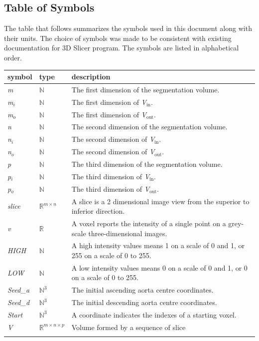 \documentclass[12pt]{article}
\begin{document}
\subsection{Table of Symbols}

The table that follows summarizes the symbols used in this document along with
their units.  The choice of symbols was made to be consistent with existing documentation for 3D Slicer program. 
The symbols are listed in alphabetical order.

\renewcommand{\arraystretch}{1.2}
\noindent \begin{longtable}{l p{2cm} p{12cm}} \toprule
  \textbf{symbol} & \textbf{type} & \textbf{description}\\
  \midrule
\textit{m} & $\mathbb{N}$ &  The first dimension of the segmentation volume.
\\
\textit{m}$_{i}$ & $\mathbb{N}$ &  The first dimension of \textit{V}$_\text{in}$.
\\
\textit{m}$_{o}$ & $\mathbb{N}$ &  The first dimension of \textit{V}$_\text{out}$.
\\
\textit{n} & $\mathbb{N}$ &  The second dimension of the segmentation volume.
\\
\textit{n}$_{i}$& $\mathbb{N}$ &  The second dimension of \textit{V}$_\text{in}$.
\\
\textit{n}$_{o}$ & $\mathbb{N}$ &  The second dimension of \textit{V}$_\text{out}$.
\\
\textit{p} & $\mathbb{N}$ &  The third dimension of the segmentation volume.
\\
\textit{p}$_{i}$ & $\mathbb{N}$ &  The third dimension of \textit{V}$_\text{in}$.
\\
\textit{p}$_{o}$ & $\mathbb{N}$ & The third dimension of \textit{V}$_\text{out}$.
\\
\textit{slice} &  $\mathbb{R}^{m \times n}$ &  A slice is a 2 dimensional image view from the superior to inferior direction.
\\
\textit{v} &  $\mathbb{R}$ &  A voxel reports the intensity of a single point on a grey-scale three-dimensional images.
\\
\textit{HIGH} &  $\mathbb{N}$ &  A high intensity values means 1 on a scale of 0 and 1, or 255 on a scale of 0 to 255.
\\ 
\textit{LOW} &  $\mathbb{N}$ &   A low intensity values means 0 on a scale of 0 and 1, or 0 on a scale of 0 to 255.
\\
\textit{Seed\_a} & $\mathbb{N}^3$ & The initial ascending aorta centre coordinates.
\\
\textit{Seed\_d} & $\mathbb{N}^3$ & The initial descending aorta centre coordinates.
\\
\textit{Start} & $\mathbb{N}^{3}$ &  A coordinate indicates the indexes of a starting voxel.
\\
\textit{V} &  $\mathbb{R}^{m \times n \times p}$ &  Volume formed by a sequence of slice
\\
\bottomrule
\label{Table of Symbols}
\end{longtable}
\end{document}
